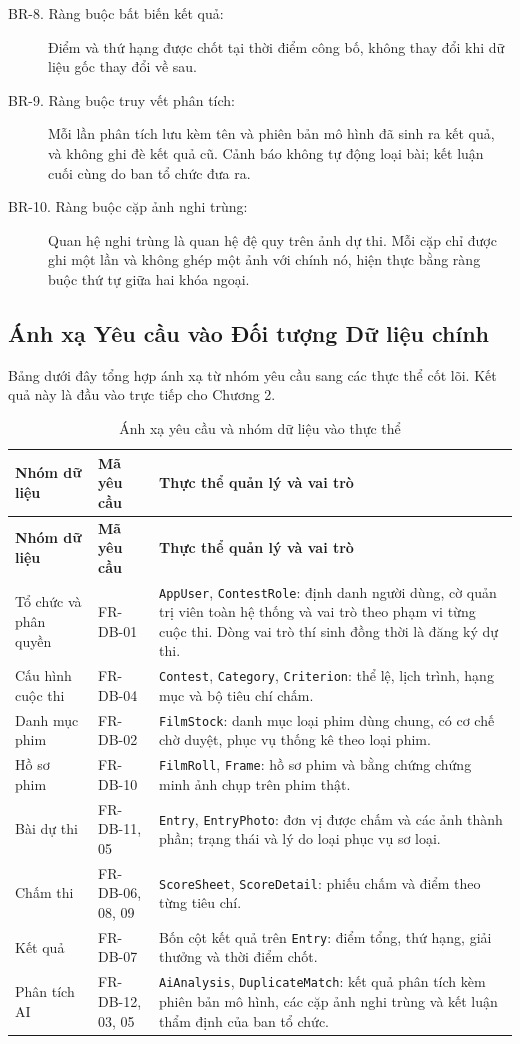 \begin{description}
    \item[BR-8. Ràng buộc bất biến kết quả:] Điểm và thứ hạng được chốt tại thời điểm công bố, không thay đổi khi dữ liệu gốc thay đổi về sau.
    \item[BR-9. Ràng buộc truy vết phân tích:] Mỗi lần phân tích lưu kèm tên và phiên bản mô hình đã sinh ra kết quả, và không ghi đè kết quả cũ. Cảnh báo không tự động loại bài; kết luận cuối cùng do ban tổ chức đưa ra.
    \item[BR-10. Ràng buộc cặp ảnh nghi trùng:] Quan hệ nghi trùng là quan hệ đệ quy trên ảnh dự thi. Mỗi cặp chỉ được ghi một lần và không ghép một ảnh với chính nó, hiện thực bằng ràng buộc thứ tự giữa hai khóa ngoại.
\end{description}

\subsection{Ánh xạ Yêu cầu vào Đối tượng Dữ liệu chính}

Bảng dưới đây tổng hợp ánh xạ từ nhóm yêu cầu sang các thực thể cốt lõi. Kết quả này là đầu vào trực tiếp cho Chương 2.


\begin{longtable}{|p{3.2cm}|L{2.4cm}|p{8.2cm}|}
\caption{Ánh xạ yêu cầu và nhóm dữ liệu vào thực thể} \\
\hline
\textbf{Nhóm dữ liệu} & \textbf{Mã yêu cầu} & \textbf{Thực thể quản lý và vai trò} \\ \hline
\endfirsthead
\hline
\textbf{Nhóm dữ liệu} & \textbf{Mã yêu cầu} & \textbf{Thực thể quản lý và vai trò} \\ \hline
\endhead
Tổ chức và phân quyền & FR-DB-01 & \texttt{AppUser}, \texttt{ContestRole}: định danh người dùng, cờ quản trị viên toàn hệ thống và vai trò theo phạm vi từng cuộc thi. Dòng vai trò thí sinh đồng thời là đăng ký dự thi. \\ \hline
Cấu hình cuộc thi & FR-DB-04 & \texttt{Contest}, \texttt{Category}, \texttt{Criterion}: thể lệ, lịch trình, hạng mục và bộ tiêu chí chấm. \\ \hline
Danh mục phim & FR-DB-02 & \texttt{FilmStock}: danh mục loại phim dùng chung, có cơ chế chờ duyệt, phục vụ thống kê theo loại phim. \\ \hline
Hồ sơ phim & FR-DB-10 & \texttt{FilmRoll}, \texttt{Frame}: hồ sơ phim và bằng chứng chứng minh ảnh chụp trên phim thật. \\ \hline
Bài dự thi & FR-DB-11, 05 & \texttt{Entry}, \texttt{EntryPhoto}: đơn vị được chấm và các ảnh thành phần; trạng thái và lý do loại phục vụ sơ loại. \\ \hline
Chấm thi & FR-DB-06, 08, 09 & \texttt{ScoreSheet}, \texttt{ScoreDetail}: phiếu chấm và điểm theo từng tiêu chí. \\ \hline
Kết quả & FR-DB-07 & Bốn cột kết quả trên \texttt{Entry}: điểm tổng, thứ hạng, giải thưởng và thời điểm chốt. \\ \hline
Phân tích AI & FR-DB-12, 03, 05 & \texttt{AiAnalysis}, \texttt{DuplicateMatch}: kết quả phân tích kèm phiên bản mô hình, các cặp ảnh nghi trùng và kết luận thẩm định của ban tổ chức. \\ \hline
\end{longtable}


